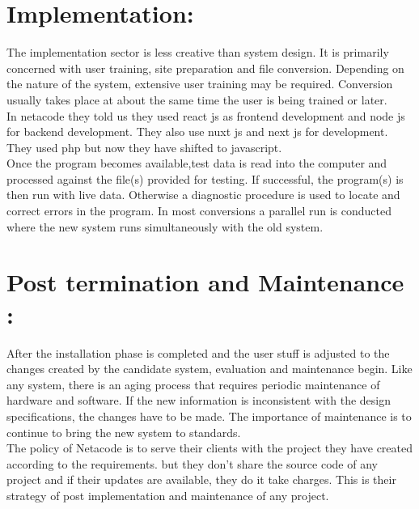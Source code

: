 \documentclass[a4paper,12pt]{report}
\begin{document}
\section{Implementation:}
The implementation sector is less creative than system design. It is primarily concerned with user training, site preparation and file conversion. Depending on the nature of the system, extensive user training may be required. Conversion usually takes place at about the same time the user is being trained or later.\\

In netacode they told us they used  react js as frontend development and node js for backend development. They also use nuxt js and next js for development. They used php but now they have shifted to javascript. \\

Once the program becomes available,test data is read into the computer and  processed against the file(s) provided for testing. If successful, the program(s) is then run with live data. Otherwise  a diagnostic procedure is used to locate and correct errors in the program. In most conversions a parallel run is conducted where the new system runs simultaneously with the old system. 
\section{Post termination and Maintenance : }
After the installation phase is completed and the user stuff is adjusted to the changes created by the candidate system, evaluation and  maintenance begin. Like any system, there is an aging process that requires periodic maintenance of hardware and software. If the new information is inconsistent with the design specifications, the changes have to be made. The importance of maintenance is to continue to bring the new system to standards.\\ 

The policy of Netacode is to serve their clients with the project they have created according to the requirements. but they don't share the source code of any project and if their updates are available, they do it take charges. This is their strategy of post implementation and maintenance of any project.
\end{document}
